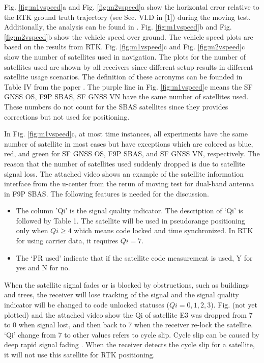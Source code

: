 \documentclass[letterpaper, 10 pt,onecolumn]{article}
\begin{document}
	Fig. \ref{fig:m1vspeed}a and Fig. \ref{fig:m2vspeed}a show the horizontal error relative to the RTK ground truth trajectory (see Sec. VI.D in [1]) during the moving test. Additionally, the analysis can be found in \cite{hu2021using}. Fig. \ref{fig:m1vspeed}b and Fig. \ref{fig:m2vspeed}b show the vehicle speed over ground. The vehicle speed plots are based on the results from RTK. 
	Fig. \ref{fig:m1vspeed}c and Fig. \ref{fig:m2vspeed}c show the number of satellites used in navigation. 
	The plots for the number of satellites used are shown by all receivers since different setup results in different satellite usage scenarios. 
	The definition of these acronyms can be founded in Table IV from the paper \cite{hu2021using}. The purple line in Fig. \ref{fig:m1vspeed}c means the SF GNSS OS, F9P SBAS, SF GNSS VN have the same number of satellites used. These numbers do not count for the SBAS satellites since they provides corrections but not used for positioning.
	
	In Fig. \ref{fig:m1vspeed}c, at most time instances, all experiments have the same number of satellite in most cases but have exceptions which are colored as blue, red, and green for SF GNSS OS, F9P SBAS, and SF GNSS VN, respectively. The reason that the number of satellites used suddenly dropped is due to satellite signal loss. The attached video shows an example of the satellite information interface from the u-center from the rerun of moving test for dual-band antenna in F9P SBAS. The following features is needed for the discussion. 
	\begin{itemize}
		\item The column 'Qi' is the signal quality indicator. The description of `Qi' is followed by Table 1. The satellite will be used in pseudorange positioning only when $Qi \geq 4$ which means code locked and time synchronized. In RTK for using carrier data, it requires $Qi = 7$.
		\item The `PR used' indicate that if the satellite code measurement is used, Y for yes and N for no.
	\end{itemize}
	
	When the satellite signal fades or is blocked by obstructions, such as buildings and trees, the receiver will lose tracking of the signal and the signal quality indicator will be changed to code unlocked statuses ($Qi = 0,1,2,3$). \red Fig. (not yet plotted) \black and the attached video show the Qi of satellite E3 was dropped from 7 to 0 when signal lost, and then back to 7 when the receiver re-lock the satellite. `Qi' change from 7 to other values refers to cycle slip. Cycle slip can be caused by deep rapid signal fading \cite{sennott1992use}. When the receiver detects the cycle slip for a satellite, it will not use this satellite for RTK positioning.
	
\end{document}
